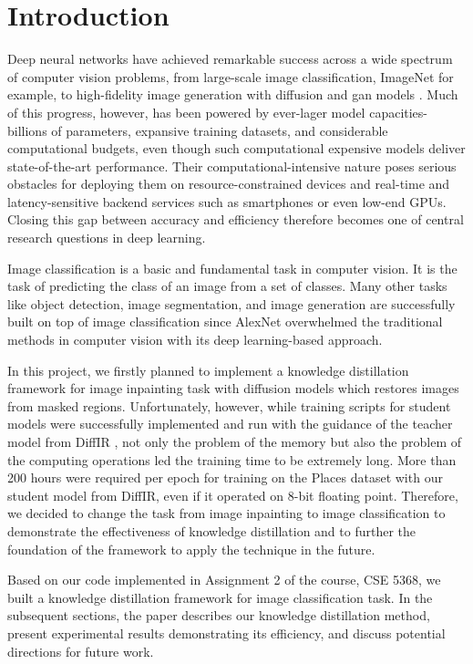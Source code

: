 \section{Introduction}

Deep neural networks have achieved remarkable success across a wide spectrum of computer vision problems,
from large-scale image classification, ImageNet \cite{deng2009imagenet} for example, to high-fidelity image generation with diffusion \cite{ho2020denoising, rombach2022high, xia2023diffir} and \gls*{gan} models \cite{goodfellow2014generative, nazeri2019edgeconnect}.
Much of this progress, however, has been powered by ever-lager model capacities-
billions of parameters, expansive training datasets, and considerable computational budgets,
even though such computational expensive models deliver state-of-the-art performance.
Their computational-intensive nature poses serious obstacles for deploying them
on resource-constrained devices and real-time and latency-sensitive backend services
such as smartphones or even low-end GPUs.
Closing this gap between accuracy and efficiency therefore becomes one of central research questions in deep learning.

Image classification is a basic and fundamental task in computer vision.
It is the task of predicting the class of an image from a set of classes.
Many other tasks like object detection, image segmentation, and image generation
are successfully built on top of image classification
since AlexNet \cite{krizhevsky2012imagenet} overwhelmed the traditional methods
in computer vision with its deep learning-based approach.

In this project, we firstly planned to implement a knowledge distillation framework
for image inpainting task with diffusion models
which restores images from masked regions.
Unfortunately, however, while training scripts for student models were successfully implemented and run with the guidance of the teacher model from DiffIR \cite{xia2023diffir},
not only the problem of the memory but also the problem of the computing operations
led the training time to be extremely long.
More than 200 hours were required per epoch for training on the Places dataset \cite{zhou2017places} with our student model from DiffIR,
even if it operated on 8-bit floating point.
Therefore, we decided to change the task from image inpainting to image classification
to demonstrate the effectiveness of knowledge distillation
and to further the foundation of the framework to apply the technique in the future.

Based on our code implemented in Assignment 2 of the course, CSE 5368,
we built a knowledge distillation framework for image classification task.
In the subsequent sections, the paper describes our knowledge distillation method, present experimental results demonstrating its efficiency, and discuss potential directions for future work.
